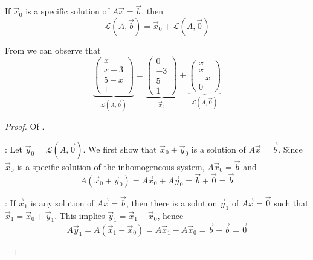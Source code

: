 \begin{thm}\label{thm-homogeneous-inhomogeneous-solution-sets}
	If $\vec{x}_0$ is a specific solution of $A\vec{x}=\vec{b}$, then
	\begin{equation*}
		\mathcal{L}(A,\vec{b})=\vec{x}_0+\mathcal{L}(A,\vec{0})
	\end{equation*}
\end{thm}

\begin{exm}
	From  we can observe that
	\begin{equation*}
		\underbrace{
			\begin{pmatrix}
				x   \\
				x-3 \\
				5-x \\
				1
			\end{pmatrix}
		}_{\mathcal{L}(A,\vec{b})}=
		\underbrace{
			\begin{pmatrix}
				0  \\
				-3 \\
				5  \\
				1
			\end{pmatrix}
		}_{\vec{x}_0}+
		\underbrace{
			\begin{pmatrix}
				x  \\
				x  \\
				-x \\
				0
			\end{pmatrix}
		}_{\mathcal{L}(A,\vec{0})}
	\end{equation*}
\end{exm}

\begin{proof}
	Of .
	\begin{flushleft}
		\proofright:
		Let $\vec{y}_0=\mathcal{L}(A,\vec{0})$. We first show that $\vec{x}_0+\vec{y}_0$ is
		a solution of $A\vec{x}=\vec{b}$. Since $\vec{x}_0$ is a specific solution of
		the inhomogeneous system, $A\vec{x}_0=\vec{b}$ and
		\begin{equation*}
			A(\vec{x}_0+\vec{y}_0)=A\vec{x}_0+A\vec{y}_0=\vec{b}+\vec{0}=\vec{b}
		\end{equation*}
	\end{flushleft}
	\begin{flushleft}
		\proofleft: If $\vec{x}_1$ is any solution of $A\vec{x}=\vec{b}$,
		then there is a solution $\vec{y}_1$ of $A\vec{x}=\vec{0}$ such that
		$\vec{x}_1=\vec{x}_0+\vec{y}_1$. This implies $\vec{y}_1=\vec{x}_1-\vec{x}_0$,
		hence
		\begin{equation*}
			A\vec{y}_1=A(\vec{x}_1-\vec{x}_0)=A\vec{x}_1-A\vec{x}_0=\vec{b}-\vec{b}=\vec{0}
		\end{equation*}
	\end{flushleft}
\end{proof}

